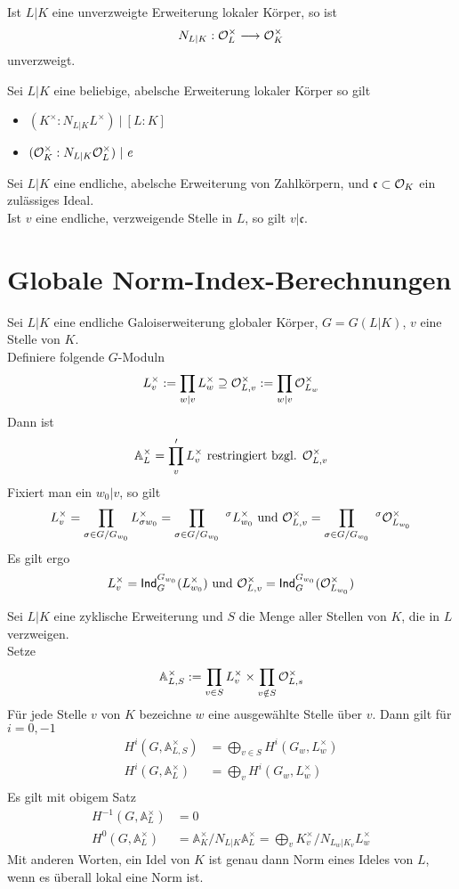 \documentclass{book}
\renewcommand{\A}{\mathbb{A}}
\renewcommand{\i}{^{-1}}
\newcommand{\cf}{\mathfrak{c}}
\begin{document}
\Kor{}
Ist $L|K$ eine unverzweigte Erweiterung lokaler Körper, so ist
\[ N_{L|K} : \mathcal{O}_L^\times \overset{}{\longrightarrow} \mathcal{O}_K^\times \]
unverzweigt.

\Kor{}
Sei $L|K$ eine beliebige, abelsche Erweiterung lokaler Körper so gilt
\begin{itemize}
\item $(K^\times : N_{L|K} L^\times ) ~|~ [L:K]$
\item $(\mathcal{O}_K^\times : N_{L|K} \mathcal{O}_L^\times ) ~|~ e$
\end{itemize}

\Bem{}
Sei $L|K$ eine endliche, abelsche Erweiterung von Zahlkörpern, und $\cf \subset \O_K$ ein zulässiges Ideal.\\
Ist $v$ eine endliche, verzweigende Stelle in $L$, so gilt $v | \cf$.

\section{Globale Norm-Index-Berechnungen}
\Def{}
Sei $L|K$ eine endliche Galoiserweiterung globaler Körper, $G = G(L|K)$, $v$ eine Stelle von $K$.\\
Definiere folgende $G$-Moduln
\[ L_v^\times := \prod_{w|v} L_w^\times \supseteq \mathcal{O}_{L,v}^\times := \prod_{w|v}\mathcal{O}_{L_w}^\times \]
Dann ist
\[ \A_L^\times = \prod'_vL_v^\times \text{ restringiert bzgl. } \O_{L,v}^\times  \]
Fixiert man ein $w_0|v$, so gilt
\[ L_v^\times = \prod_{\sigma \in G/G_{w_0}} L_{\sigma w_0}^\times = \prod_{\sigma \in G/G_{w_0}} \ ^\sigma L_{w_0}^\times \text{ und } \O_{L,v}^\times = \prod_{\sigma \in G/G_{w_0}} \ ^\sigma \O_{L_{w_0}}^\times \]
Es gilt ergo
\[ L^\times_v = \textsf{Ind}_G^{G_{w_0}} (L_{w_0}^\times) \text{ und } \mathcal{O}^\times_{L, v} = \textsf{Ind}_G^{G_{w_0}} (\mathcal{O}_{L_{w_0}}^\times) \]

\Satz{}
Sei $L|K$ eine zyklische Erweiterung und $S$ die Menge aller Stellen von $K$, die in $L$ verzweigen.\\
Setze
\[ \A_{L,S}^\times := \prod_{v\in S}L_v^\times \times \prod_{v\notin S} \O_{L,s}^\times \]
Für jede Stelle $v$ von $K$ bezeichne $w$ eine ausgewählte Stelle über $v$. Dann gilt für $i = 0,-1$
\begin{align*}
H^i(G, \A_{L,S}^\times ) &= \bigoplus_{v\in S}H^i(G_w, L_w^\times)\\
H^i(G, \A_{L}^\times ) &= \bigoplus_{v}H^i(G_w, L_w^\times)\\
\end{align*}
\Bem{}
Es gilt mit obigem Satz
\begin{align*}
H\i (G, \A_L^\times) &= 0\\
H^0(G,\A_L^\times) &= \A_K^\times/N_{L|K}\A_L^\times = \bigoplus_{v} K_v^\times / N_{L_w|K_v}L_w^\times
\end{align*}
Mit anderen Worten, ein Idel von $K$ ist genau dann Norm eines Ideles von $L$, wenn es überall lokal eine Norm ist.
\end{document}
